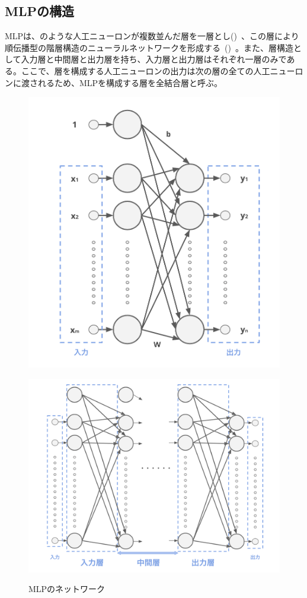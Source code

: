 \subsection{MLPの構造}

MLPは、のような人工ニューロンが複数並んだ層を一層とし()~、この層により順伝播型の階層構造のニューラルネットワークを形成する~()~。また、層構造として入力層と中間層と出力層を持ち、入力層と出力層はそれぞれ一層のみである。ここで、層を構成する人工ニューロンの出力は次の層の全ての人工ニューロンに渡されるため、MLPを構成する層を全結合層と呼ぶ。

\begin{figure}[b]
\centering
\begin{minipage}[b]{0.48\columnwidth}
\centering
\includegraphics[width=0.75\columnwidth]{figure/mlp_net0.png}
\label{fig:MLP_net0}
\end{minipage}
\begin{minipage}[b]{0.48\columnwidth}
\centering
\includegraphics[width=\columnwidth]{figure/mlp_net1.png}
\label{fig:MLP_net1}
\end{minipage}
\caption{MLPのネットワーク}
\end{figure}


